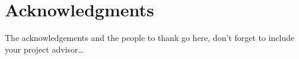 \chapter{Acknowledgments} %

The acknowledgements and the people to thank go here, don't forget to include your project advisor\ldots


\cleardoublepage %

